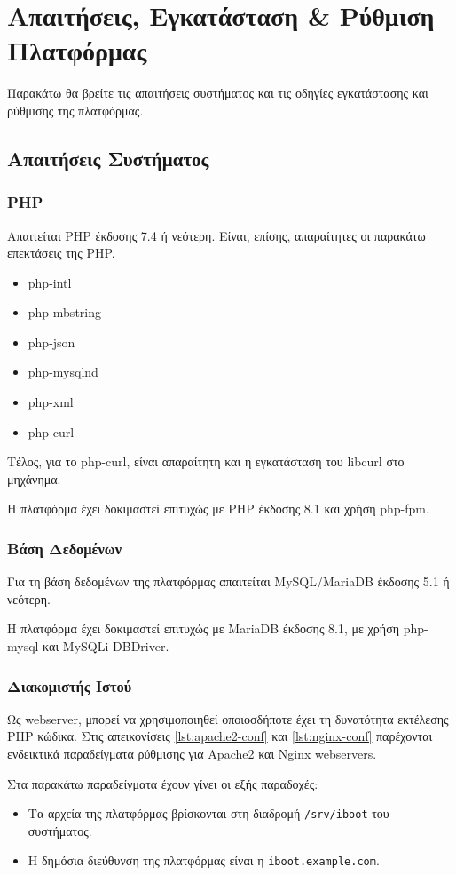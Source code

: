 \chapter{Απαιτήσεις, Εγκατάσταση \& Ρύθμιση Πλατφόρμας}
Παρακάτω θα βρείτε τις απαιτήσεις συστήματος και τις οδηγίες εγκατάστασης και ρύθμισης της πλατφόρμας.

\section{Απαιτήσεις Συστήματος}

\subsection{PHP}
Απαιτείται PHP έκδοσης 7.4 ή νεότερη.
Είναι, επίσης, απαραίτητες οι παρακάτω επεκτάσεις της PHP.

\begin{itemize}
	\item php-intl
	\item php-mbstring
	\item php-json
	\item php-mysqlnd
	\item php-xml
	\item php-curl
\end{itemize}

Τέλος, για το php-curl, είναι απαραίτητη και η εγκατάσταση του libcurl στο μηχάνημα.

Η πλατφόρμα έχει δοκιμαστεί επιτυχώς με PHP έκδοσης 8.1 και χρήση php-fpm.

\subsection{Βάση Δεδομένων}
Για τη βάση δεδομένων της πλατφόρμας απαιτείται MySQL/MariaDB έκδοσης 5.1 ή νεότερη.

Η πλατφόρμα έχει δοκιμαστεί επιτυχώς με MariaDB έκδοσης 8.1, με χρήση php-mysql και MySQLi DBDriver.

\subsection{Διακομιστής Ιστού}
Ως webserver, μπορεί να χρησιμοποιηθεί οποιοσδήποτε έχει τη δυνατότητα εκτέλεσης PHP κώδικα. Στις απεικονίσεις \ref{lst:apache2-conf} και \ref{lst:nginx-conf} παρέχονται ενδεικτικά παραδείγματα ρύθμισης για Apache2 και Nginx webservers.

Στα παρακάτω παραδείγματα έχουν γίνει οι εξής παραδοχές:
\begin{itemize}
	\item Τα αρχεία της πλατφόρμας βρίσκονται στη διαδρομή \verb!/srv/iboot! του συστήματος.
	\item Η δημόσια διεύθυνση της πλατφόρμας είναι η \verb!iboot.example.com!.
\end{itemize}

